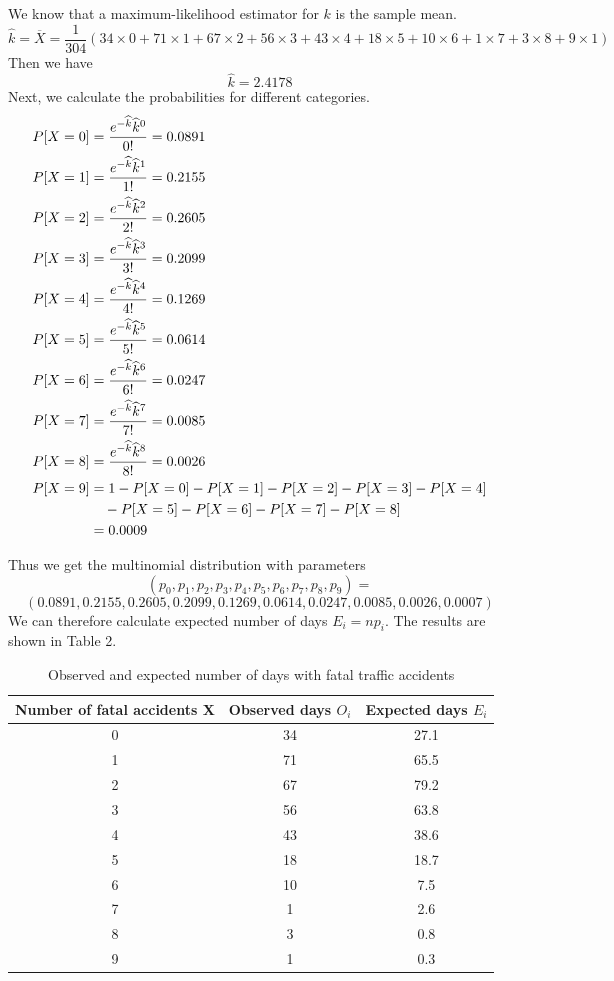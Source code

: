 \documentclass[a4paper,12pt]{article}
\begin{document}
\noindent We know that a maximum-likelihood estimator for $k$ is the sample mean.
\begin{equation}
\widehat{k}=\overline{X}=\frac{1}{304}(34\times 0+71\times 1+67\times 2+56\times 3+43\times 4 
+18\times 5+10\times 6+1\times 7+3\times 8+9\times 1)
\end{equation}
Then we have
\begin{equation}\label{*}
\widehat{k}=2.4178
\end{equation}
\noindent Next, we calculate the probabilities for different categories.
\begin{equation}
\centering
\begin{split}
P[X=0]&=\frac{e^{-\widehat{k}}\widehat{k}^0}{0!}=0.0891\\
P[X=1]&=\frac{e^{-\widehat{k}}\widehat{k}^1}{1!}=0.2155\\
P[X=2]&=\frac{e^{-\widehat{k}}\widehat{k}^2}{2!}=0.2605\\
P[X=3]&=\frac{e^{-\widehat{k}}\widehat{k}^3}{3!}=0.2099\\
P[X=4]&=\frac{e^{-\widehat{k}}\widehat{k}^4}{4!}=0.1269\\
P[X=5]&=\frac{e^{-\widehat{k}}\widehat{k}^5}{5!}=0.0614\\
P[X=6]&=\frac{e^{-\widehat{k}}\widehat{k}^6}{6!}=0.0247\\
P[X=7]&=\frac{e^{-\widehat{k}}\widehat{k}^7}{7!}=0.0085\\
P[X=8]&=\frac{e^{-\widehat{k}}\widehat{k}^8}{8!}=0.0026\\
P[X=9]&=1-P[X=0]-P[X=1]-P[X=2]-P[X=3]-P[X=4]\\
	  &\quad-P[X=5]-P[X=6]-P[X=7]-P[X=8]\\
	  &=0.0009
\end{split}
\end{equation}

\noindent Thus we get the multinomial distribution with parameters $$(p_0,p_1,p_2,p_3,p_4,p_5,p_6,p_7,p_8,p_9)=$$
$$( 0.0891,0.2155,0.2605,0.2099,0.1269,0.0614,0.0247,0.0085,0.0026,0.0007)
$$
\newpage
\noindent We can therefore calculate expected number of days $E_i=np_i$. The results are shown in Table 2.
\begin{table}[hbp]
\centering
\begin{tabular}{|c|c|c|}
\hline
Number of fatal accidents X&Observed days $O_i$&Expected days $E_i$\\
\hline
0&34&27.1\\
\hline
1&71&65.5\\
\hline
2&67&79.2\\
\hline
3&56&63.8\\
\hline
4&43&38.6\\
\hline
5&18&18.7\\
\hline
6&10&7.5\\
\hline
7&1&2.6\\
\hline
8&3&0.8\\
\hline
9&1&0.3\\
\hline
\end{tabular}
\caption{Observed and expected number of days with fatal traffic accidents}
\end{table}
\end{document}

